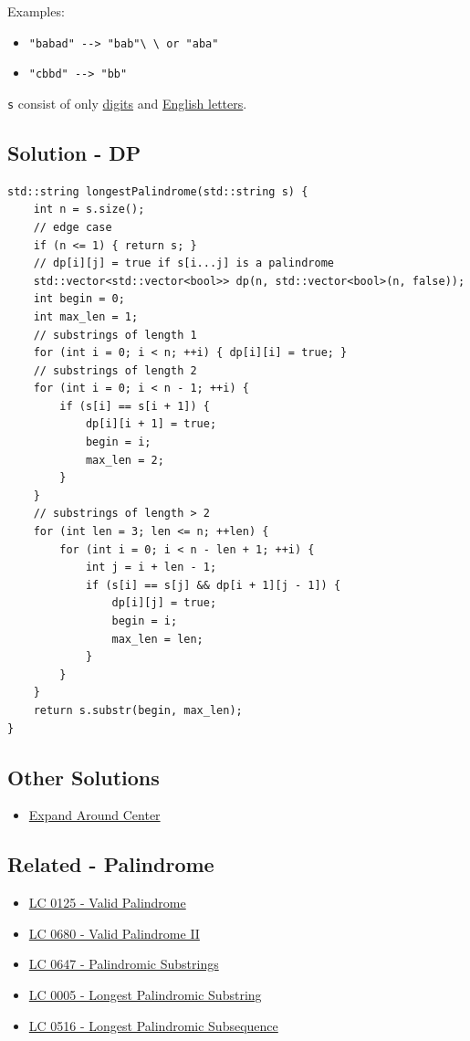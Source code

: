 Examples:
\begin{itemize}
	\item {\colorbox{CodeBackground}{\lstinline|"babad" --> "bab"\ \ or "aba"|}}
	\item {\colorbox{CodeBackground}{\lstinline|"cbbd" --> "bb"|}}
\end{itemize}

{\colorbox{CodeBackground}{\lstinline|s|}} consist of only \ul{digits} and \ul{English letters}.\\

\subsection*{Solution - DP}\label{solution:lc0005_dp}
\begin{lstlisting}
std::string longestPalindrome(std::string s) {
	int n = s.size();
	// edge case
	if (n <= 1) { return s; }
	// dp[i][j] = true if s[i...j] is a palindrome
	std::vector<std::vector<bool>> dp(n, std::vector<bool>(n, false));
	int begin = 0;
	int max_len = 1;
	// substrings of length 1
	for (int i = 0; i < n; ++i) { dp[i][i] = true; }
	// substrings of length 2
	for (int i = 0; i < n - 1; ++i) {
		if (s[i] == s[i + 1]) {
			dp[i][i + 1] = true;
			begin = i;
			max_len = 2;
		}
	}
	// substrings of length > 2
	for (int len = 3; len <= n; ++len) {
		for (int i = 0; i < n - len + 1; ++i) {
			int j = i + len - 1;
			if (s[i] == s[j] && dp[i + 1][j - 1]) {
				dp[i][j] = true;
				begin = i;
				max_len = len;
			}
		}
	}
	return s.substr(begin, max_len);
}
\end{lstlisting}

\subsection*{Other Solutions}
\begin{itemize}
	\item \hyperref[solution:lc0005_expand_around_center]{Expand Around Center}
\end{itemize}

\subsection*{Related - Palindrome}
\begin{itemize}
	\item \hyperref[lc0125]{LC 0125 - Valid Palindrome}
 	\item \hyperref[lc0680]{LC 0680 - Valid Palindrome II}
	\item \hyperref[lc0647]{LC 0647 - Palindromic Substrings}
	\item \hyperref[lc0005]{LC 0005 - Longest Palindromic Substring}
	\item \hyperref[lc0516]{LC 0516 - Longest Palindromic Subsequence}
\end{itemize}

